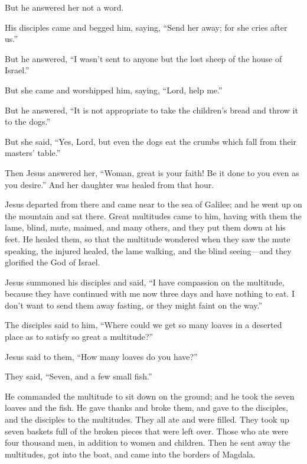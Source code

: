  But he answered her not a word.

His disciples came and begged him, saying, ``Send her away; for she
cries after us.''

 But he answered, ``I wasn't sent to anyone but the lost
sheep of the house of Israel.''

 But she came and worshipped him, saying, ``Lord, help
me.''

 But he answered, ``It is not appropriate to take the
children's bread and throw it to the dogs.''

 But she said, ``Yes, Lord, but even the dogs eat the
crumbs which fall from their masters' table.''

 Then Jesus answered her, ``Woman, great is your faith!
Be it done to you even as you desire.'' And her daughter was healed from
that hour.

 Jesus departed from there and came near to the sea of
Galilee; and he went up on the mountain and sat there. 
Great multitudes came to him, having with them the lame, blind, mute,
maimed, and many others, and they put them down at his feet. He healed
them,  so that the multitude wondered when they saw the
mute speaking, the injured healed, the lame walking, and the blind
seeing---and they glorified the God of Israel.

 Jesus summoned his disciples and said, ``I have
compassion on the multitude, because they have continued with me now
three days and have nothing to eat. I don't want to send them away
fasting, or they might faint on the way.''

 The disciples said to him, ``Where could we get so many
loaves in a deserted place as to satisfy so great a multitude?''

 Jesus said to them, ``How many loaves do you have?''

They said, ``Seven, and a few small fish.''

 He commanded the multitude to sit down on the ground;
 and he took the seven loaves and the fish. He gave
thanks and broke them, and gave to the disciples, and the disciples to
the multitudes.  They all ate and were filled. They took
up seven baskets full of the broken pieces that were left over.
 Those who ate were four thousand men, in addition to
women and children.  Then he sent away the multitudes,
got into the boat, and came into the borders of Magdala.

